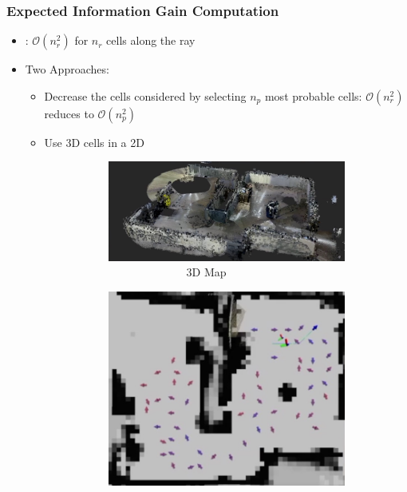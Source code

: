 \documentclass[11pt,professionalfonts,hyperref={pdftex,pdfpagemode=none,pdfstartview=FitH}]{beamer}
\renewcommand{\emph}[1]{\textit{\textbf{\color{blue}{#1}}}}
\begin{document}
\begin{frame}
\frametitle{Expected Information Gain Computation}

\begin{itemize}
	\item \emph{Squared Complexity}: $\mathcal O(n_r^2)$ for $n_r$ cells along the ray
	\vspace*{0.0cm}\pause
	\item Two Approaches:
	\begin{itemize}
		\vspace*{0.0cm}\pause
		\item Decrease the cells considered by selecting $n_p$ most probable cells: $\mathcal O(n_r^2)$ reduces to $\mathcal O(n_p^2)$
		\vspace*{0.0cm}\pause
		\item Use 3D cells in a 2D \emph{projection}
\begin{figure}
  \centering
  \begin{subfigure}[t]{.3\linewidth}
    \centering\includegraphics[height=.75\linewidth]{experiment_ogm3D_2min47sec.jpg}
    \caption*{\ \ \ \ \ \ \ \ \ \ \ \ \ \ 3D Map}
  \end{subfigure}
  \hspace*{0.25\linewidth}
  \begin{subfigure}[t]{.3\linewidth}
    \centering\includegraphics[height=.75\linewidth]{experiment_2min47sec.jpg}

\end{subfigure}
\end{figure}
\end{itemize}
\end{itemize}
\end{frame}
\end{document}
